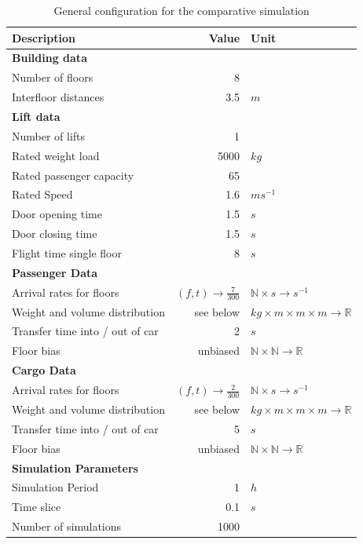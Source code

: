 \begin{table}[]
\centering
\begin{tabular}{lrl}
\textbf{Description} \hspace{4cm}   & \textbf{Value}   & \textbf{Unit}   \\
\hline
\multicolumn{3}{l}{\textbf{Building data}} \\
Number of floors & 8 &        \\
Interfloor distances & 3.5 & $m$\\
\hline
\multicolumn{3}{l}{\textbf{Lift data}}     \\
Number of lifts & 1 & \\
Rated weight load & 5000 & $kg$\\
Rated passenger capacity & 65 & \\
Rated Speed & 1.6 & $ms^{-1}$ \\
Door opening time & 1.5 & $s$\\
Door closing time & 1.5 & $s$\\
Flight time single floor & 8 & $s$\\
\hline
\multicolumn{3}{l}{\textbf{Passenger Data}}\\
Arrival rates for floors & $ (f, t) \rightarrow \frac{7}{300} $ & $ \mathbb{N} \times s \rightarrow s^{-1}$\\
Weight and volume distribution & see below & $kg \times m \times m \times m \rightarrow \mathbb{R}$\\
Transfer time into / out of car & 2 & $s$\\
Floor bias & unbiased & $ \mathbb{N} \times \mathbb{N} \rightarrow \mathbb{R} $ \\
\hline
\multicolumn{3}{l}{\textbf{Cargo Data}}\\
Arrival rates for floors & $ (f, t) \rightarrow \frac{2}{300} $ & $\mathbb{N} \times s \rightarrow s^{-1}$\\
Weight and volume distribution & see below & $kg \times m \times m \times m \rightarrow \mathbb{R}$\\
Transfer time into / out of car & 5 & $s$\\
Floor bias & unbiased & $ \mathbb{N} \times \mathbb{N} \rightarrow \mathbb{R} $ \\
\hline
\multicolumn{3}{l}{\textbf{Simulation Parameters}}\\
Simulation Period & 1 & $h$\\
Time slice & 0.1 & $s$\\
Number of simulations & 1000 & \\
\end{tabular}
\caption{\label{tab:design:simulationconfig} General configuration for the comparative simulation}
\end{table}

